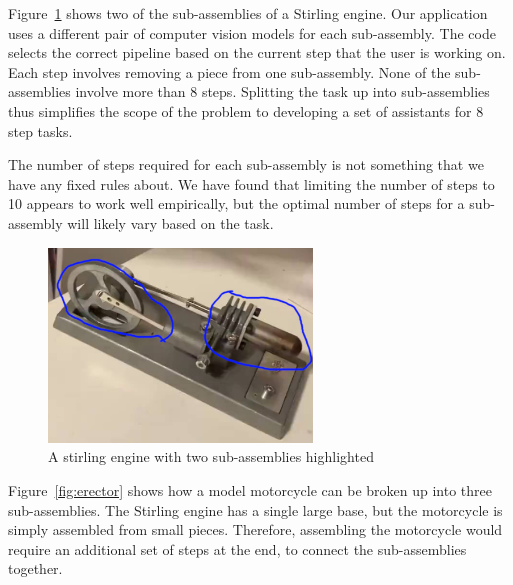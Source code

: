 Figure~\ref{fig:stirling_full} shows two of the sub-assemblies of a Stirling
engine.
Our application uses a different pair of computer vision models for each
sub-assembly.
The code selects the correct pipeline based on the current step that the user is
working on.
Each step involves removing a piece from one sub-assembly.
None of the sub-assemblies involve more than 8 steps.
Splitting the task up into sub-assemblies thus simplifies the scope of the
problem to developing a set of assistants for 8 step tasks.

The number of steps required for each sub-assembly is not something that we have
any fixed rules about. We have found that limiting the number of steps to 10
appears to work well empirically, but the optimal number of steps for a
sub-assembly will likely vary based on the task.

\begin{figure}
  \includegraphics[width=7cm]{figures/stirling/full.png}
  \caption{A stirling engine with two sub-assemblies highlighted
  }\label{fig:stirling_full}
\end{figure}

Figure~\ref{fig:erector} shows how a model motorcycle can be broken up into
three sub-assemblies.
The Stirling engine has a single large base, but the motorcycle is simply
assembled from small pieces. Therefore, assembling the motorcycle would require
an additional set of steps at the end, to connect the sub-assemblies together.


